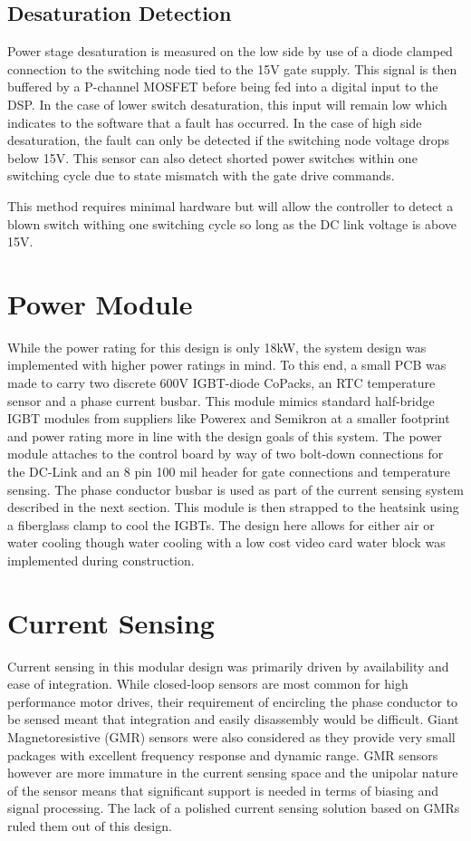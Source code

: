 \subsection{Desaturation Detection}
Power stage desaturation is measured on the low side by use of a diode clamped
connection to the switching node tied to the 15V gate supply.
This signal is then buffered by a P-channel MOSFET before being fed into a
digital input to the DSP.
In the case of lower switch desaturation, this input will remain low which
indicates to the software that a fault has occurred.
In the case of high side desaturation, the fault can only be detected if the
switching node voltage drops below 15V.
This sensor can also detect shorted power switches within one switching cycle
due to state mismatch with the gate drive commands.

This method requires minimal hardware but will allow the controller to detect
a blown switch withing one switching cycle so long as the DC link voltage is
above 15V.

\section{Power Module}
While the power rating for this design is only 18kW, the system design was
implemented with higher power ratings in mind.
To this end, a small PCB was made to carry two discrete 600V IGBT-diode
CoPacks, an RTC temperature sensor and a phase current busbar.
This module mimics standard half-bridge IGBT modules from suppliers like
Powerex and Semikron at a smaller footprint and power rating more in line with
the design goals of this system.
The power module attaches to the control board by way of two bolt-down
connections for the DC-Link and an 8 pin 100 mil header for gate connections
and temperature sensing.
The phase conductor busbar is used as part of the current sensing system
described in the next section.
This module is then strapped to the heatsink using a fiberglass clamp to cool
the IGBTs.
The design here allows for either air or water cooling though water cooling
with a low cost video card water block was implemented during construction.

\section{Current Sensing}
Current sensing in this modular design was primarily driven by availability
and ease of integration.
While closed-loop sensors are most common for high performance motor drives,
their requirement of encircling the phase conductor to be sensed meant that
integration and easily disassembly would be difficult.
Giant Magnetoresistive (GMR) sensors were also considered as they provide very
small packages with excellent frequency response and dynamic range.
GMR sensors however are more immature in the current sensing space and the
unipolar nature of the sensor means that significant support is needed in
terms of biasing and signal processing.
The lack of a polished current sensing solution based on GMRs ruled them out
of this design.

